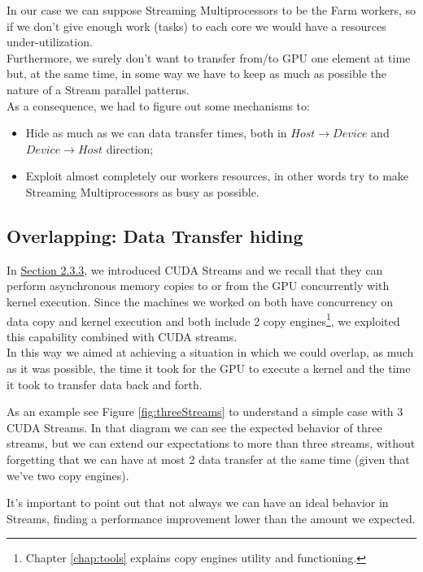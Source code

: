 	
	In our case we can suppose Streaming Multiprocessors to be the Farm workers, so if we don't give enough work (tasks) to each core we would have a resources under-utilization.\\
	Furthermore, we surely don't want to transfer from/to GPU one element at time but, at the same time, in some way we have to keep as much as possible the nature of a Stream parallel patterns.\\	
	As a consequence, we had to figure out some mechanisms to:
	\begin{itemize}
		\item Hide as much as we can data transfer times, both in  \(Host \rightarrow Device\)  and  \(Device \rightarrow Host\)  direction;
		\item Exploit almost completely our workers resources, in other words try to make Streaming Multiprocessors as busy as possible.
	\end{itemize}

	
	\subsection{Overlapping: Data Transfer hiding}
	In \hyperref[subs:stream]{Section 2.3.3}, we introduced CUDA Streams and we recall that they can perform asynchronous memory copies to or from the GPU	concurrently with kernel execution. 
	Since the machines we worked on both have concurrency on data copy and kernel execution and both include 2 copy engines\footnote{Chapter \ref{chap:tools} explains copy engines utility and functioning.}, we exploited this capability combined with CUDA streams.\\
	In this way we aimed at achieving a situation in which we could overlap, as much as it was possible, the time it took for the GPU to execute a kernel and the time it took to transfer data back and forth.
	
	As an example see Figure \ref{fig:threeStreams} to understand a simple case with 3 CUDA Streams.
	In that diagram we can see the expected behavior of three streams, but we can extend our expectations to more than three streams, without forgetting that we can have at most 2 data transfer at the same time (given that we've two copy engines).
	
	It's important to point out that not always we can have an ideal behavior in Streams, finding a performance improvement lower than the amount we expected.
	
